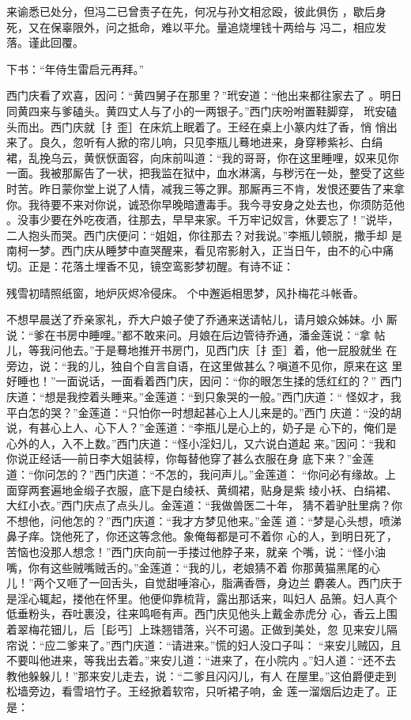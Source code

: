 来谕悉已处分，但冯二已曾责子在先，何况与孙文相忿殴，彼此俱伤
，歇后身死，又在保辜限外，问之抵命，难以平允。量追烧埋钱十两给与
冯二，相应发落。谨此回覆。

下书：“年侍生雷启元再拜。”

西门庆看了欢喜，因问：“黄四舅子在那里？”玳安道：“他出来都往家去了
。明日同黄四来与爹磕头。黄四丈人与了小的一两银子。”西门庆吩咐置鞋脚穿，
玳安磕头而出。西门庆就［扌歪］在床炕上眠着了。王经在桌上小篆内炷了香，悄
悄出来了。良久，忽听有人掀的帘儿响，只见李瓶儿蓦地进来，身穿糁紫衫、白绢
裙，乱挽乌云，黄恹恹面容，向床前叫道：“我的哥哥，你在这里睡哩，奴来见你
一面。我被那厮告了一状，把我监在狱中，血水淋漓，与秽污在一处，整受了这些
时苦。昨日蒙你堂上说了人情，减我三等之罪。那厮再三不肯，发恨还要告了来拿
你。我待要不来对你说，诚恐你早晚暗遭毒手。我今寻安身之处去也，你须防范他
。没事少要在外吃夜酒，往那去，早早来家。千万牢记奴言，休要忘了！”说毕，
二人抱头而哭。西门庆便问：“姐姐，你往那去？对我说。”李瓶儿顿脱，撒手却
是南柯一梦。西门庆从睡梦中直哭醒来，看见帘影射入，正当日午，由不的心中痛
切。正是：花落土埋香不见，镜空鸾影梦初醒。有诗不证：

残雪初晴照纸窗，地炉灰烬冷侵床。
个中邂逅相思梦，风扑梅花斗帐香。

不想早晨送了乔亲家礼，乔大户娘子使了乔通来送请帖儿，请月娘众姊妹。小
厮说：“爹在书房中睡哩。”都不敢来问。月娘在后边管待乔通，潘金莲说：“拿
帖儿，等我问他去。”于是蓦地推开书房门，见西门庆［扌歪］着，他一屁股就坐
在旁边，说：“我的儿，独自个自言自语，在这里做甚么？嗔道不见你，原来在这
里好睡也！”一面说话，一面看着西门庆，因问：“你的眼怎生揉的恁红红的？”
西门庆道：“想是我控着头睡来。”金莲道：“到只象哭的一般。”西门庆道：“
怪奴才，我平白怎的哭？”金莲道：“只怕你一时想起甚心上人儿来是的。”西门
庆道：“没的胡说，有甚心上人、心下人？”金莲道：“李瓶儿是心上的，奶子是
心下的，俺们是心外的人，入不上数。”西门庆道：“怪小淫妇儿，又六说白道起
来。”因问：“我和你说正经话──前日李大姐装椁，你每替他穿了甚么衣服在身
底下来？”金莲道：“你问怎的？”西门庆道：“不怎的，我问声儿。”金莲道：
“你问必有缘故。上面穿两套遍地金缎子衣服，底下是白绫袄、黄绸裙，贴身是紫
绫小袄、白绢裙、大红小衣。”西门庆点了点头儿。金莲道：“我做兽医二十年，
猜不着驴肚里病？你不想他，问他怎的？”西门庆道：“我才方梦见他来。”金莲
道：“梦是心头想，喷涕鼻子痒。饶他死了，你还这等念他。象俺每都是可不着你
心的人，到明日死了，苦恼也没那人想念！”西门庆向前一手搂过他脖子来，就亲
个嘴，说：“怪小油嘴，你有这些贼嘴贼舌的。”金莲道：“我的儿，老娘猜不着
你那黄猫黑尾的心儿！”两个又咂了一回舌头，自觉甜唾溶心，脂满香唇，身边兰
麝袭人。西门庆于是淫心辄起，搂他在怀里。他便仰靠梳背，露出那话来，叫妇人
品箫。妇人真个低垂粉头，吞吐裹没，往来鸣咂有声。西门庆见他头上戴金赤虎分
心，香云上围着翠梅花钿儿，后［髟丐］上珠翘错落，兴不可遏。正做到美处，忽
见来安儿隔帘说：“应二爹来了。”西门庆道：“请进来。”慌的妇人没口子叫：
“来安儿贼囚，且不要叫他进来，等我出去着。”来安儿道：“进来了，在小院内
。”妇人道：“还不去教他躲躲儿！”那来安儿走去，说：“二爹且闪闪儿，有人
在屋里。”这伯爵便走到松墙旁边，看雪培竹子。王经掀着软帘，只听裙子响，金
莲一溜烟后边走了。正是：


